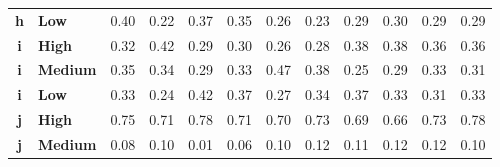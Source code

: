 \documentclass[mathematics,article,submit,moreauthors,pdftex]{mdpi}
\begin{document}
\begin{table}[H]
\begin{tabular}{@{}clrrrrrrrrrr@{}}
\textbf{h}     & \textbf{Low}       & 0.40                               & 0.22                               & 0.37                               & 0.35                               & 0.26                               & 0.23                               & 0.29                               & 0.30                               & 0.29                               & 0.29                                \\
\rowcolor[HTML]{D9D9D9} 
\textbf{i}     & \textbf{High}      & 0.32                               & 0.42                               & 0.29                               & 0.30                               & 0.26                               & 0.28                               & 0.38                               & 0.38                               & 0.36                               & 0.36                                \\
\rowcolor[HTML]{D9D9D9} 
\textbf{i}     & \textbf{Medium}    & 0.35                               & 0.34                               & 0.29                               & 0.33                               & 0.47                               & 0.38                               & 0.25                               & 0.29                               & 0.33                               & 0.31                                \\
\rowcolor[HTML]{D9D9D9} 
\textbf{i}     & \textbf{Low}       & 0.33                               & 0.24                               & 0.42                               & 0.37                               & 0.27                               & 0.34                               & 0.37                               & 0.33                               & 0.31                               & 0.33                                \\
\textbf{j}     & \textbf{High}      & 0.75                               & 0.71                               & 0.78                               & 0.71                               & 0.70                               & 0.73                               & 0.69                               & 0.66                               & 0.73                               & 0.78                                \\
\textbf{j}     & \textbf{Medium}    & 0.08                               & 0.10                               & 0.01                               & 0.06                               & 0.10                               & 0.12                               & 0.11                               & 0.12                               & 0.12                               & 0.10                                \\

\end{tabular}
\end{table}
\end{document}
